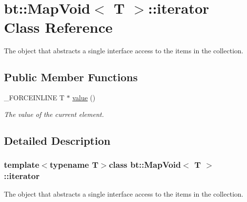 \hypertarget{classbt_1_1_map_void_1_1iterator}{\section{bt\-:\-:Map\-Void$<$ T $>$\-:\-:iterator Class Reference}
\label{classbt_1_1_map_void_1_1iterator}
}


The object that abstracts a single interface access to the items in the collection.  


\subsection*{Public Member Functions}
\begin{DoxyCompactItemize}
\item 
\hypertarget{classbt_1_1_map_void_1_1iterator_a9eae4b624428c51aa2c9404fdac83231}{\-\_\-\-F\-O\-R\-C\-E\-I\-N\-L\-I\-N\-E T $\ast$ \hyperlink{classbt_1_1_map_void_1_1iterator_a9eae4b624428c51aa2c9404fdac83231}{value} ()}\label{classbt_1_1_map_void_1_1iterator_a9eae4b624428c51aa2c9404fdac83231}

\begin{DoxyCompactList}\small\item\em The value of the current element. \end{DoxyCompactList}\end{DoxyCompactItemize}


\subsection{Detailed Description}
\subsubsection*{template$<$typename T$>$class bt\-::\-Map\-Void$<$ T $>$\-::iterator}

The object that abstracts a single interface access to the items in the collection. 